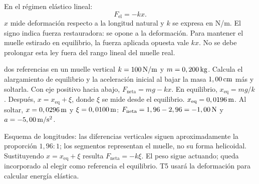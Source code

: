 \documentclass[11pt,a4paper]{article}
\begin{document}
En el r\'egimen el\'astico lineal:
\[
F_{\mathrm{el}}=-kx.
\]
$x$ mide deformaci\'on respecto a la longitud natural y $k$ se expresa en N/m.
El signo indica fuerza restauradora: se opone a la deformaci\'on.
Para mantener el muelle estirado en equilibrio, la fuerza aplicada opuesta vale $kx$.
No se debe prolongar esta ley fuera del rango lineal del muelle real.

\begin{examplebox}{dos referencias en un muelle vertical}
 $k=100\,\mathrm{N/m}$ y $m=0,200\,\mathrm{kg}$.
Calcula el alargamiento de equilibrio y la aceleraci\'on inicial al bajar
la masa $1,00\,\mathrm{cm}$ m\'as y soltarla.
\solutionblock
{} Con eje positivo hacia abajo, $F_{\mathrm{neta}}=mg-kx$.
En equilibrio, $x_{\mathrm{eq}}=mg/k$. Despu\'es,
$x=x_{\mathrm{eq}}+\xi$, donde $\xi$ se mide desde el equilibrio.
 $x_{\mathrm{eq}}=0,0196\,\mathrm{m}$.
Al soltar, $x=0,0296\,\mathrm{m}$ y $\xi=0,0100\,\mathrm{m}$:
$F_{\mathrm{neta}}=1,96-2,96=-1,00\,\mathrm{N}$ y $a=-5,00\,\mathrm{m/s^2}$.
\begin{center}
\end{center}
Esquema de longitudes: las diferencias verticales siguen aproximadamente la proporci\'on $1,96:1$;
los segmentos representan el muelle, no su forma helicoidal.
 Sustituyendo $x=x_{\mathrm{eq}}+\xi$ resulta
$F_{\mathrm{neta}}=-k\xi$. El peso sigue actuando; queda incorporado al elegir
como referencia el equilibrio. T5 usar\'a la deformaci\'on para calcular energ\'ia el\'astica.
\end{examplebox}
\end{document}
